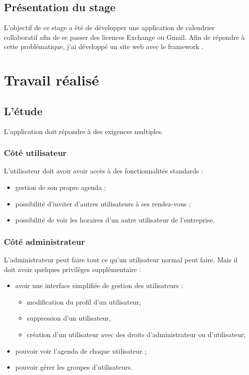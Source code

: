 \documentclass[a4paper, 11pt]{report}
\begin{document}
\chapter{Présentation du stage}
L'objectif de ce stage a été de développer une application de calendrier collaboratif afin de se passer des licences Exchange ou Gmail. Afin de répondre à cette problématique, j'ai développé un site web avec le framework \php \symfony.

\part{Travail réalisé}
\chapter{L'étude}
L'application doit répondre à des exigences multiples.
    \section{Côté utilisateur}
    L'utilisateur doit avoir avoir accès à des fonctionnalités standards :
    \begin{itemize}
        \item gestion de son propre agenda ;
        \item possibilité d'inviter d'autres utilisateurs à ses rendez-vous ;
        \item possibilité de voir les horaires d'un autre utilisateur de l'entreprise.
    \end{itemize}
    \section{Côté administrateur}
    L'administrateur peut faire tout ce qu'un utilisateur normal peut faire. Mais il doit avoir quelques privilèges supplémentaire :
    \begin{itemize}
        \item avoir une interface simplifiée de gestion des utilisateurs :
        \begin{itemize}
            \item modification du profil d'un utilisateur,
            \item suppression d'un utilisateur,
            \item création d'un utilisateur avec des droits d'administrateur ou d'utilisateur;
        \end{itemize}
        \item pouvoir voir l'agenda de chaque utilisateur ;
        \item pouvoir gérer les groupes d'utilisateurs.
    \end{itemize}
\end{document}
